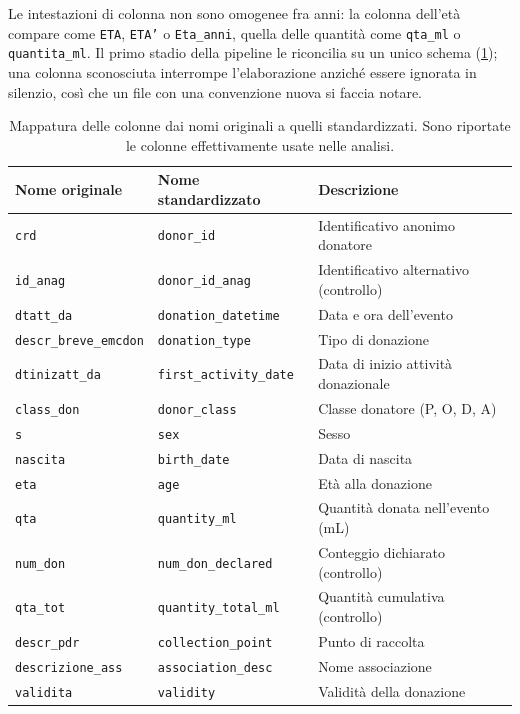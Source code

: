 Le intestazioni di colonna non sono omogenee fra anni: la colonna dell'età
compare come \texttt{ETA}, \texttt{ETA'} o \texttt{Eta\_anni}, quella delle
quantità come \texttt{qta\_ml} o \texttt{quantita\_ml}. Il primo stadio della
pipeline le riconcilia su un unico schema (\cref{tab:colmap}); una colonna
sconosciuta interrompe l'elaborazione anziché essere ignorata in silenzio, così
che un file con una convenzione nuova si faccia notare.

\begin{table}[ht]
\centering
\caption{Mappatura delle colonne dai nomi originali a quelli standardizzati.
Sono riportate le colonne effettivamente usate nelle analisi.}
\label{tab:colmap}
\small
\setlength{\tabcolsep}{4pt}
\begin{tabular}{@{}lll@{}}
\toprule
\textbf{Nome originale} & \textbf{Nome standardizzato} & \textbf{Descrizione} \\
\midrule
\texttt{crd}                  & \texttt{donor\_id}            & Identificativo anonimo donatore \\
\texttt{id\_anag}             & \texttt{donor\_id\_anag}      & Identificativo alternativo (controllo) \\
\texttt{dtatt\_da}            & \texttt{donation\_datetime}   & Data e ora dell'evento \\
\texttt{descr\_breve\_emcdon} & \texttt{donation\_type}       & Tipo di donazione \\
\texttt{dtinizatt\_da}        & \texttt{first\_activity\_date}& Data di inizio attività donazionale \\
\texttt{class\_don}           & \texttt{donor\_class}         & Classe donatore (P, O, D, A) \\
\texttt{s}                    & \texttt{sex}                  & Sesso \\
\texttt{nascita}              & \texttt{birth\_date}          & Data di nascita \\
\texttt{eta}                  & \texttt{age}                  & Età alla donazione \\
\texttt{qta}                  & \texttt{quantity\_ml}         & Quantità donata nell'evento (mL) \\
\texttt{num\_don}             & \texttt{num\_don\_declared}   & Conteggio dichiarato (controllo) \\
\texttt{qta\_tot}             & \texttt{quantity\_total\_ml}  & Quantità cumulativa (controllo) \\
\texttt{descr\_pdr}           & \texttt{collection\_point}    & Punto di raccolta \\
\texttt{descrizione\_ass}     & \texttt{association\_desc}    & Nome associazione \\
\texttt{validita}             & \texttt{validity}             & Validità della donazione \\
\bottomrule
\end{tabular}
\end{table}

